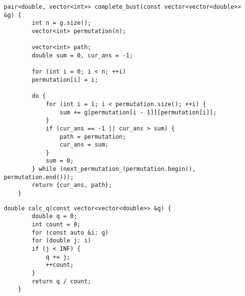 \clearpage
\begin{lstlisting}[caption={Алгоритм полного перебора}, label=lst:std_imp]
	pair<double, vector<int>> complete_bust(const vector<vector<double>> &g) {
		int n = g.size();
		vector<int> permutation(n);
		
		vector<int> path;
		double sum = 0, cur_ans = -1;
		
		for (int i = 0; i < n; ++i)
		permutation[i] = i;
		
		do {
			for (int i = 1; i < permutation.size(); ++i) {
				sum += g[permutation[i - 1]][permutation[i]];
			}
			if (cur_ans == -1 || cur_ans > sum) {
				path = permutation;
				cur_ans = sum;
			}
			sum = 0;
		} while (next_permutation_(permutation.begin(), permutation.end()));
		return {cur_ans, path};
	}
\end{lstlisting}
\begin{lstlisting}[caption={Вычисление дневной дозы феромона}, label=lst:win_imp]
	double calc_q(const vector<vector<double>> &g) {
		double q = 0;
		int count = 0;
		for (const auto &i: g)
		for (double j: i)
		if (j < INF) {
			q += j;
			++count;
		}
		return q / count;
	}
\end{lstlisting}
\clearpage

